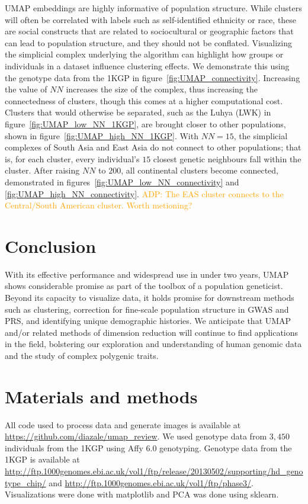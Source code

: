 \documentclass[12pt]{article}
\newcommand{\adpcomment}[1]{{\textcolor{orange}{ADP: #1}}}
\begin{document}
UMAP embeddings are highly informative of population structure. While clusters will often be correlated with labels such as self-identified ethnicity or race, these are social constructs that are related to sociocultural or geographic factors that can lead to population structure, and they should not be conflated. Visualizing the simplicial complex underlying the algorithm can highlight how groups or individuals in a dataset influence clustering effects. We demonstrate this using the genotype data from the 1KGP in figure~\ref{fig:UMAP_connectivity}. Increasing the value of $NN$ increases the size of the complex, thus increasing the connectedness of clusters, though this comes at a higher computational cost. Clusters that would otherwise be separated, such as the Luhya (LWK) in figure~\ref{fig:UMAP_low_NN_1KGP}, are brought closer to other populations, shown in figure~\ref{fig:UMAP_high_NN_1KGP}. With $NN=15$, the simplicial complexes of South Asia and East Asia do not connect to other populations; that is, for each cluster, every individual's $15$ closest genetic neighbours fall within the cluster. After raising $NN$ to $200$, all continental clusters become connected, demonstrated in figures~\ref{fig:UMAP_low_NN_connectivity} and \ref{fig:UMAP_high_NN_connectivity}. \adpcomment{The EAS cluster connects to the Central/South American cluster. Worth metioning?} 

\section*{Conclusion}
With its effective performance and widespread use in under two years, UMAP shows considerable promise as part of the toolbox of a population geneticist. Beyond its capacity to visualize data, it holds promise for downstream methods such as clustering, correction for fine-scale population structure in GWAS and PRS, and identifying unique demographic histories. We anticipate that UMAP and/or related methods of dimension reduction will continue to find applications in the field, bolstering our exploration and understanding of human genomic data and the study of complex polygenic traits.

\section*{Materials and methods}
All code used to process data and generate images is available at \url{https://github.com/diazale/umap_review}. We used genotype data from $3,450$ individuals from the 1KGP using Affy 6.0 genotyping\cite{10002015global}. Genotype data from the 1KGP is available at \url{http://ftp.1000genomes.ebi.ac.uk/vol1/ftp/release/20130502/supporting/hd_genotype_chip/} and \url{http://ftp.1000genomes.ebi.ac.uk/vol1/ftp/phase3/}. Visualizations were done with matplotlib\cite{Hunter2007} and PCA was done using sklearn\cite{scikit-learn}.
\end{document}

